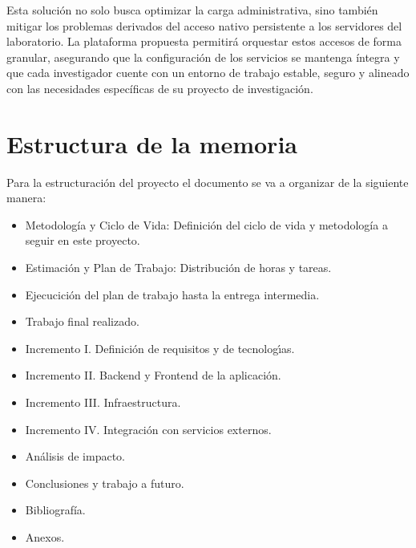 Esta solución no solo busca optimizar la carga administrativa, sino también mitigar los problemas derivados del acceso nativo persistente a los servidores del laboratorio. La plataforma propuesta permitirá orquestar estos accesos de forma granular, asegurando que la configuración de los servicios se mantenga íntegra y que cada investigador cuente con un entorno de trabajo estable, seguro y alineado con las necesidades específicas de su proyecto de investigación.

\section{Estructura de la memoria}
Para la estructuración del proyecto el documento se va a organizar de la siguiente manera:
\begin{itemize}
  \item Metodología y Ciclo de Vida: Definición del ciclo de vida y metodología a seguir en este proyecto.
  \item Estimación y Plan de Trabajo: Distribución de horas y tareas.
  \item Ejecucición del plan de trabajo hasta la entrega intermedia. 
  \item Trabajo final realizado.
  \item Incremento I. Definición de requisitos y de tecnologı́as.
  \item Incremento II. Backend y Frontend de la aplicación.
  \item Incremento III. Infraestructura.
  \item Incremento IV. Integración con servicios externos.
  \item Análisis de impacto.
  \item Conclusiones y trabajo a futuro.
  \item Bibliografía.
  \item Anexos.
\end{itemize}
